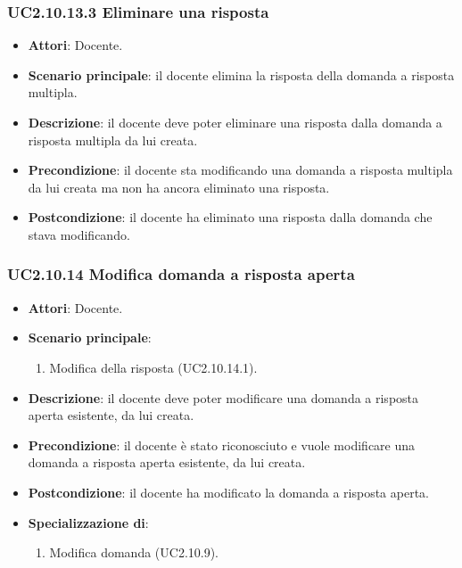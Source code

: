 \subsubsection{UC2.10.13.3 Eliminare una risposta}
\begin{itemize}
\item \textbf{Attori}: Docente.
\item \textbf{Scenario principale}: il docente elimina la risposta della domanda a risposta multipla.
\item \textbf{Descrizione}: il docente deve poter eliminare una risposta dalla domanda a risposta multipla da lui creata.
\item \textbf{Precondizione}: il docente sta modificando una domanda a risposta multipla da lui creata ma non ha ancora eliminato una risposta.
\item \textbf{Postcondizione}: il docente ha eliminato una risposta dalla domanda che stava modificando.
\end{itemize}
\subsubsection{UC2.10.14 Modifica domanda a risposta aperta}
\begin{itemize}
\item \textbf{Attori}: Docente.
\item \textbf{Scenario principale}:
\begin{enumerate}
\item Modifica della risposta (UC2.10.14.1).
\end{enumerate}
\item \textbf{Descrizione}: il docente deve poter modificare una domanda a risposta aperta esistente, da lui creata.
\item \textbf{Precondizione}: il docente è stato riconosciuto e vuole modificare una domanda a risposta aperta esistente, da lui creata.
\item \textbf{Postcondizione}: il docente ha modificato la domanda a risposta aperta.
\item \textbf{Specializzazione di}:
\begin{enumerate}
\item Modifica domanda (UC2.10.9).
\end{enumerate}
\end{itemize}
